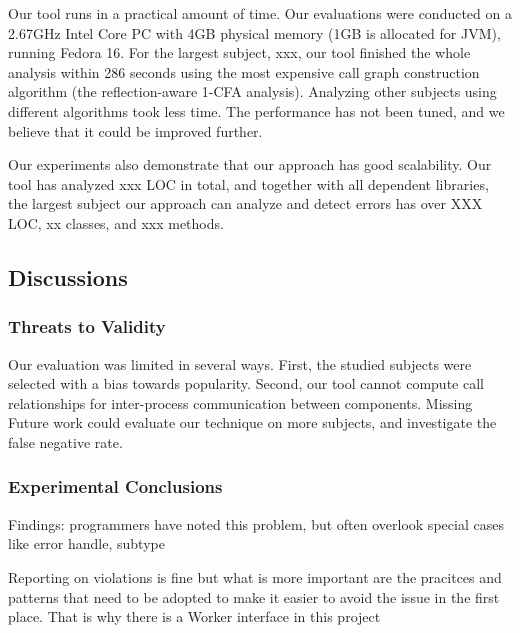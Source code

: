 Our tool runs in a practical amount of time. Our evaluations
were conducted on a 2.67GHz Intel Core PC with 4GB
physical memory (1GB is allocated for JVM), running Fedora 16.
For the largest subject, xxx, our tool finished the whole analysis
within 286 seconds using the most expensive call graph construction
algorithm (the reflection-aware 1-CFA analysis). Analyzing
other subjects using different algorithms took less time.
The performance has not been tuned, and we believe
that it could be improved further.

Our experiments also demonstrate that our approach has good scalability.
Our tool has analyzed xxx LOC in total, and together with all dependent libraries,
the largest subject our approach can analyze and detect errors has
over XXX LOC, xx classes, and xxx methods.


\subsection{Discussions}


\subsubsection{Threats to Validity}

Our evaluation was limited in several ways. First, the studied
subjects were selected with a bias towards popularity. Second,
our tool cannot compute call relationships
for inter-process communication between components. Missing
Future work could evaluate our technique on more subjects, and
investigate the false negative rate.

\subsubsection{Experimental Conclusions}
Findings: programmers have noted this problem, but often overlook special cases like error handle, subtype

 Reporting on violations is fine but what is more important are the pracitces and patterns that need to be adopted to make it easier to avoid the issue in the first place. That is why there is a Worker interface in this project
